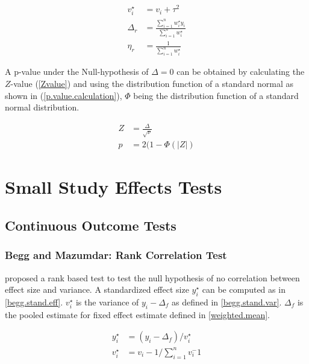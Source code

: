 \documentclass[11pt,a4paper,twoside]{book}\usepackage[]{graphicx}\usepackage[]{color}
\begin{document}
\begin{align}
v_{i}^\star &= v_{i} + \tau^2 \label{ranef.study.variance} \\
\Delta_{r} &= \frac{\sum_{i = 1}^n w_{i}^\star y_{i}}{\sum_{i = 1}^n w_{i}^\star} \label{ranef.weighted.mean} \\
\eta_{r} &= \frac{1}{\sum_{i = 1}^n w_{i}^\star} \label{ranef.reciproce.variance}
\end{align}

A p-value under the Null-hypothesis of $\Delta = 0$ can be obtained by calculating the $Z$-value (\ref{Zvalue}) and using the distribution function of a standard normal as shown in (\ref{p.value.calculation}), $\Phi$ being the distribution function of a standard normal distribution. 

\begin{align}
Z &= \frac{\Delta}{\sqrt{\nu}} \label{Zvalue} \\
p &= 2(1 - \Phi(|{Z}|) \label{p.value.calculation}
\end{align}

\section{Small Study Effects Tests}
\subsection{Continuous Outcome Tests}

\subsubsection{Begg and Mazumdar: Rank Correlation Test}
\citet{begg.ties} proposed a rank based test to test the null hypothesis of no correlation between effect size and variance.
A standardized effect size $y_{i}^\star$ can be computed as in \ref{begg.stand.eff}. $v_{i}^\star$ is the variance of $y_{i} - \Delta_{f}$ as defined in \ref{begg.stand.var}. $\Delta_{f}$ is the pooled estimate for fixed effect estimate defined in \ref{weighted.mean}. 

\begin{align}
y_{i}^\star &= (y_{i} - \Delta_{f})/v_{i}^\star \label{begg.stand.eff} \\
v_{i}^\star &= v_{i} - 1/\sum_{i = 1}^n v_{i}^-1 \label{begg.stand.var} 
\end{align}
\end{document}
